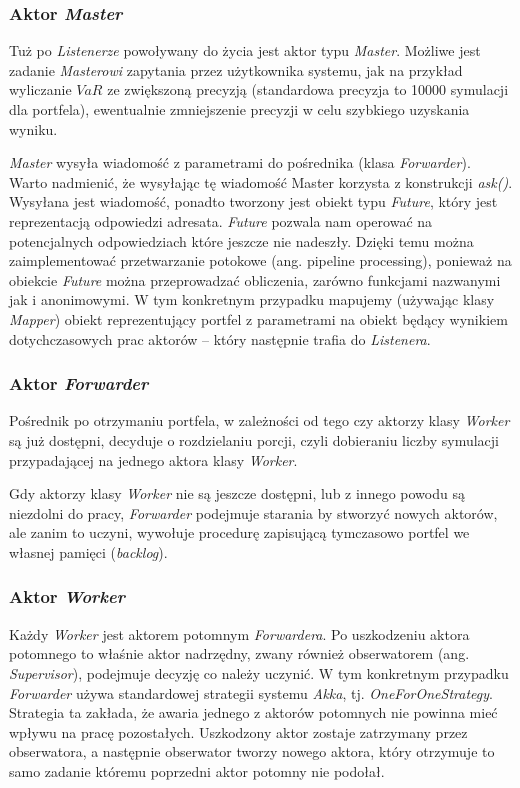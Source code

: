 \documentclass[12pt,titlepage]{article}
\numberwithin{equation}{section}
\begin{document}
\subsubsection{Aktor \textit{Master}}
Tuż po \textit{Listenerze} powoływany do życia jest aktor typu \textit{Master}. Możliwe jest zadanie \textit{Masterowi} zapytania przez użytkownika systemu, jak na przykład wyliczanie $VaR$ ze zwiększoną precyzją (standardowa precyzja to 10000 symulacji dla portfela), ewentualnie zmniejszenie precyzji w celu szybkiego uzyskania
wyniku.

\textit{Master} wysyła wiadomość z parametrami do pośrednika (klasa \textit{Forwarder}). Warto nadmienić, że wysyłając tę wiadomość Master korzysta z konstrukcji \textit{ask()}. Wysyłana jest wiadomość, ponadto tworzony jest obiekt typu \textit{Future}, który jest reprezentacją odpowiedzi adresata. \textit{Future} pozwala nam operować na potencjalnych odpowiedziach które jeszcze nie nadeszły. Dzięki temu można zaimplementować przetwarzanie potokowe (ang. pipeline processing), ponieważ na obiekcie \textit{Future} można przeprowadzać obliczenia,
zarówno funkcjami nazwanymi jak i anonimowymi. W tym konkretnym przypadku mapujemy (używając klasy \textit{Mapper}) obiekt reprezentujący portfel z parametrami na obiekt będący wynikiem dotychczasowych prac aktorów – który następnie trafia do \textit{Listenera}.


\subsubsection{Aktor \textit{Forwarder}}
Pośrednik po otrzymaniu portfela, w zależności od tego czy aktorzy klasy \textit{Worker} są już dostępni, decyduje o rozdzielaniu porcji, czyli dobieraniu liczby symulacji przypadającej na jednego aktora klasy \textit{Worker}.

Gdy aktorzy klasy \textit{Worker} nie są jeszcze dostępni, lub z innego powodu są niezdolni do pracy, \textit{Forwarder} podejmuje starania by stworzyć nowych aktorów, ale zanim to uczyni, wywołuje  procedurę zapisującą tymczasowo portfel we własnej pamięci (\textit{backlog}).


\subsubsection{Aktor \textit{Worker}}

Każdy \textit{Worker} jest aktorem potomnym \textit{Forwardera}. Po uszkodzeniu aktora potomnego to właśnie aktor nadrzędny, zwany również obserwatorem (ang. \textit{Supervisor}), podejmuje decyzję co należy uczynić. W tym konkretnym przypadku \textit{Forwarder} używa standardowej strategii systemu \textit{Akka}, tj. \textit{OneForOneStrategy}.
Strategia ta zakłada, że awaria jednego z aktorów potomnych nie powinna mieć
wpływu na pracę pozostałych. Uszkodzony aktor zostaje zatrzymany przez
obserwatora, a następnie obserwator tworzy nowego aktora, który otrzymuje to
samo zadanie któremu poprzedni aktor potomny nie podołał.
\end{document}
